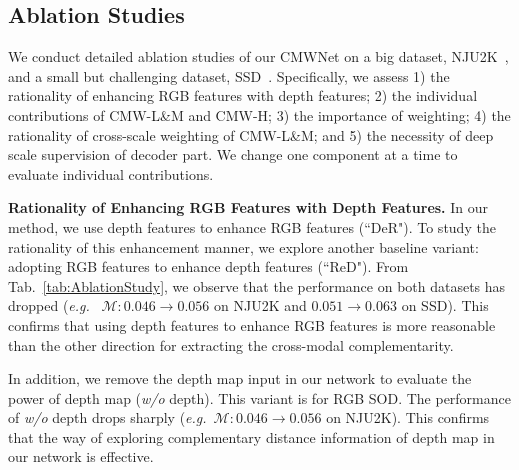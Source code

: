\documentclass[runningheads]{llncs}
\newcommand{\eg}{\emph{e.g.}}
\begin{document}
\subsection{Ablation Studies}
\label{sec:AblationStudy}

We conduct detailed ablation studies of our CMWNet on
a big dataset, NJU2K~\cite{Ju2014NJU2K}, and
a small but challenging dataset, SSD~\cite{SSD2017}.
Specifically, we assess
1) the rationality of enhancing RGB features with depth features;
2) the individual contributions of CMW-L\&M and CMW-H;
3) the importance of weighting;
4) the rationality of cross-scale weighting of CMW-L\&M;
and 5) the necessity of deep scale supervision of decoder part.
We change one component at a time to evaluate individual contributions.


\noindent\textbf{Rationality of Enhancing RGB Features with Depth Features.}
In our method, we use depth features to enhance RGB features (``DeR").
To study the rationality of this enhancement manner,
we explore another baseline variant: adopting RGB features
to enhance depth features (``ReD").
From Tab.~\ref{tab:AblationStudy}, we observe that the performance on
both datasets has dropped (\eg
~$\mathcal{M}\!: 0.046\!\rightarrow\!0.056$ on NJU2K and
$0.051\!\rightarrow\!0.063$ on SSD).
This confirms that using depth features to enhance RGB features is more
reasonable than the other direction for extracting the cross-modal complementarity.


In addition, we remove the depth map input in our network to evaluate the power
of depth map (\textit{w/o} depth).
This variant is for RGB SOD.
The performance of \textit{w/o} depth drops sharply
(\eg~$\mathcal{M}\!: 0.046\!\rightarrow\!0.056$ on NJU2K).
This confirms that the way of exploring complementary distance information of depth map
in our network is effective.
\end{document}
